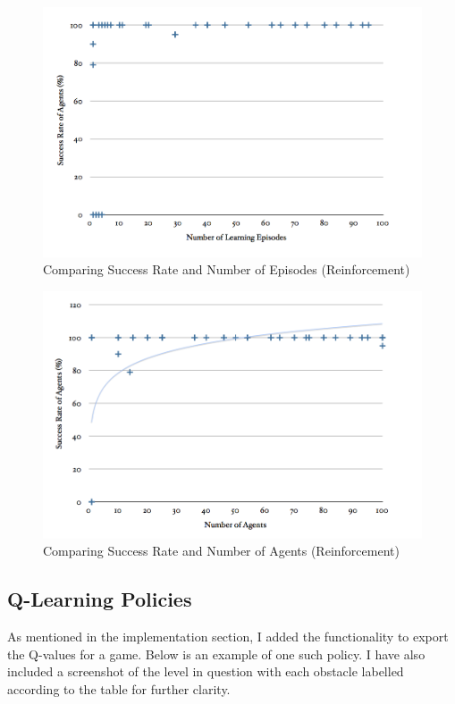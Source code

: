 \documentclass[a4paper,oneside]{report}
\begin{document}
\begin{figure}[H]
  \centering
    \includegraphics[width=130mm]{sources/images/SE_RL}
    \caption{Comparing Success Rate and Number of Episodes (Reinforcement)}
    \label{fig:SE_RL}
\end{figure}

\begin{figure}[H]
  \centering
    \includegraphics[width=130mm]{sources/images/SA_RL}
    \caption{Comparing Success Rate and Number of Agents (Reinforcement)}
    \label{fig:SA_RL}
\end{figure}

\subsection{Q-Learning Policies}

As mentioned in the implementation section, I added the functionality to export the Q-values for a game. Below is an example of one such policy. I have also included a screenshot of the level in question with each obstacle labelled according to the table for further clarity.
\end{document}
